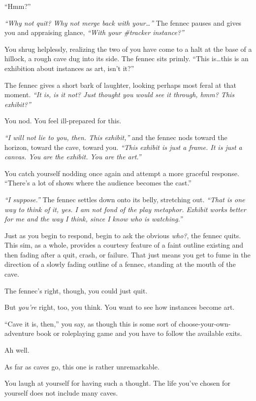 ``Hmm?''

\emph{``Why not quit? Why not merge back with your\ldots{}''} The fennec pauses and gives you and appraising glance, \emph{``With your \#tracker instance?''}

You shrug helplessly, realizing the two of you have come to a halt at the base of a hillock, a rough cave dug into its side. The fennec sits primly. ``This is\ldots{}this is an exhibition about instances as art, isn't it?''

The fennec gives a short bark of laughter, looking perhaps most feral at that moment. \emph{``It is, is it not? Just thought you would see it through, hmm? This exhibit?''}

You nod. You feel ill-prepared for this.

\emph{``I will not lie to you, then. This exhibit,''} and the fennec nods toward the horizon, toward the cave, toward you. \emph{``This exhibit is just a frame. It is just a canvas. You are the exhibit. You are the art.''}

You catch yourself nodding once again and attempt a more graceful response. ``There's a lot of shows where the audience becomes the cast.''

\emph{``I suppose.''} The fennec settles down onto its belly, stretching out. \emph{``That is one way to think of it, yes. I am not fond of the play metaphor. Exhibit works better for me and the way I think, since I know who is watching.''}

Just as you begin to respond, begin to ask the obvious \emph{who?}, the fennec quits. This sim, as a whole, provides a courtesy feature of a faint outline existing and then fading after a quit, crash, or failure. That just means you get to fume in the direction of a slowly fading outline of a fennec, standing at the mouth of the cave.

The fennec's right, though, you could just quit.

But \emph{you're} right, too, you think. You want to see how instances become art.

``Cave it is, then,'' you say, as though this is some sort of choose-your-own-adventure book or roleplaying game and you have to follow the available exits.

Ah well.

\newpage
\null
\vfill

As far as caves go, this one is rather unremarkable.

You laugh at yourself for having such a thought. The life you've chosen for yourself does not include many caves.

